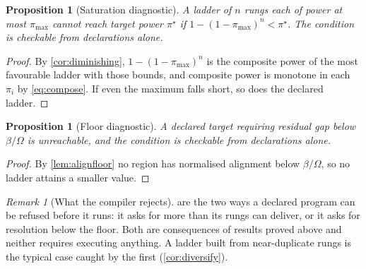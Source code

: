 \documentclass[11pt,twocolumn,a4paper]{article}
\theoremstyle{plain}
\newtheorem{proposition}[theorem]{Proposition}
\theoremstyle{definition}
\theoremstyle{remark}
\newtheorem{remark}[theorem]{Remark}
\newcommand{\flo}{\beta}
\newcommand{\pow}{\pi}
\newcommand{\Tot}{\Omega}
\begin{document}
\begin{proposition}[Saturation diagnostic]
\label{prop:satdiag}
A ladder of $n$ rungs each of power at most $\pow_{\max}$ cannot reach target
power $\pow^\star$ if $1-(1-\pow_{\max})^n < \pow^\star$. The condition is
checkable from declarations alone.
\end{proposition}

\begin{proof}
By \cref{cor:diminishing}, $1-(1-\pow_{\max})^n$ is the composite power of the
most favourable ladder with those bounds, and composite power is monotone in
each $\pow_i$ by \cref{eq:compose}. If even the maximum falls short, so does the
declared ladder.
\end{proof}

\begin{proposition}[Floor diagnostic]
\label{prop:floordiag}
A declared target requiring residual gap below $\flo/\Tot$ is unreachable, and
the condition is checkable from declarations alone.
\end{proposition}

\begin{proof}
By \cref{lem:alignfloor} no region has normalised alignment below $\flo/\Tot$,
so no ladder attains a smaller value.
\end{proof}

\begin{remark}[What the compiler rejects]
\label{rem:compiler}
 are the two ways a declared program can be
refused before it runs: it asks for more than its rungs can deliver, or it asks
for resolution below the floor. Both are consequences of results proved above
and neither requires executing anything. A ladder built from near-duplicate
rungs is the typical case caught by the first
(\cref{cor:diversify}).
\end{remark}
\end{document}
